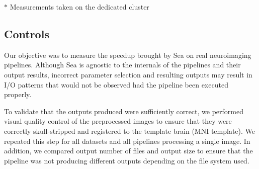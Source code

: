 \documentclass[fleqn,10pt]{wlscirep}
\begin{document}
    
    \begin{table}[t]
      \small\centering
    \footnotesize{$*$ Measurements taken on the dedicated cluster}
    \caption{Pipeline execution characteristics based on the processing of a single fMRI image using a single application process}
    \label{table:seaneuro-pipelines}
  \end{table}

    \subsection{Controls}
    Our objective was to measure the speedup brought by Sea on real neuroimaging
    pipelines. Although Sea is agnostic to the internals of the pipelines and
    their output results, incorrect parameter selection and resulting outputs
    may result in I/O patterns that would not be observed had the pipeline been
    executed properly.
   
    To validate that the outputs produced were sufficiently correct, we
    performed visual quality control of the preprocessed images to ensure that
    they were correctly skull-stripped and registered to the template brain (MNI
    template). We repeated this step for all datasets and all pipelines
    processing a single image. In addition, we compared output number of files
    and output size to ensure that the pipeline was not producing different
    outputs depending on the file system used.
    
\end{document}
